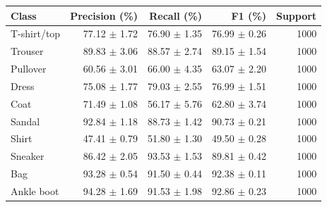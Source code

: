 \begin{tabular}{lrrrr}
\toprule
Class & Precision (\%) & Recall (\%) & F1 (\%) & Support \\
\midrule
T-shirt/top & 77.12 $\pm$ 1.72 & 76.90 $\pm$ 1.35 & 76.99 $\pm$ 0.26 & 1000 \\
Trouser & 89.83 $\pm$ 3.06 & 88.57 $\pm$ 2.74 & 89.15 $\pm$ 1.54 & 1000 \\
Pullover & 60.56 $\pm$ 3.01 & 66.00 $\pm$ 4.35 & 63.07 $\pm$ 2.20 & 1000 \\
Dress & 75.08 $\pm$ 1.77 & 79.03 $\pm$ 2.55 & 76.99 $\pm$ 1.51 & 1000 \\
Coat & 71.49 $\pm$ 1.08 & 56.17 $\pm$ 5.76 & 62.80 $\pm$ 3.74 & 1000 \\
Sandal & 92.84 $\pm$ 1.18 & 88.73 $\pm$ 1.42 & 90.73 $\pm$ 0.21 & 1000 \\
Shirt & 47.41 $\pm$ 0.79 & 51.80 $\pm$ 1.30 & 49.50 $\pm$ 0.28 & 1000 \\
Sneaker & 86.42 $\pm$ 2.05 & 93.53 $\pm$ 1.53 & 89.81 $\pm$ 0.42 & 1000 \\
Bag & 93.28 $\pm$ 0.54 & 91.50 $\pm$ 0.44 & 92.38 $\pm$ 0.11 & 1000 \\
Ankle boot & 94.28 $\pm$ 1.69 & 91.53 $\pm$ 1.98 & 92.86 $\pm$ 0.23 & 1000 \\
\bottomrule
\end{tabular}

